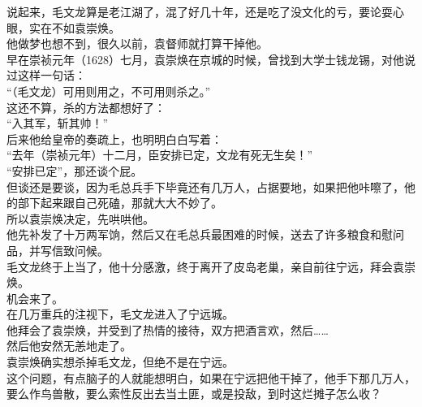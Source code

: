 \begin{multicols}{\theparacolNo}
说起来，毛文龙算是老江湖了，混了好几十年，还是吃了没文化的亏，要论耍心眼，实在不如袁崇焕。\\

他做梦也想不到，很久以前，袁督师就打算干掉他。\\

早在崇祯元年（1628）七月，袁崇焕在京城的时候，曾找到大学士钱龙锡，对他说过这样一句话：\\

“（毛文龙）可用则用之，不可用则杀之。”\\

这还不算，杀的方法都想好了：\\

“入其军，斩其帅！”\\

后来他给皇帝的奏疏上，也明明白白写着：\\

“去年（崇祯元年）十二月，臣安排已定，文龙有死无生矣！”\\

“安排已定”，那还谈个屁。\\

但谈还是要谈，因为毛总兵手下毕竟还有几万人，占据要地，如果把他咔嚓了，他的部下起来跟自己死磕，那就大大不妙了。\\

所以袁崇焕决定，先哄哄他。\\

他先补发了十万两军饷，然后又在毛总兵最困难的时候，送去了许多粮食和慰问品，并写信致问候。\\

毛文龙终于上当了，他十分感激，终于离开了皮岛老巢，亲自前往宁远，拜会袁崇焕。\\

机会来了。\\

在几万重兵的注视下，毛文龙进入了宁远城。\\

他拜会了袁崇焕，并受到了热情的接待，双方把酒言欢，然后……\\

然后他安然无恙地走了。\\

袁崇焕确实想杀掉毛文龙，但绝不是在宁远。\\

这个问题，有点脑子的人就能想明白，如果在宁远把他干掉了，他手下那几万人，要么作鸟兽散，要么索性反出去当土匪，或是投敌，到时这烂摊子怎么收？\\


\end{multicols}
